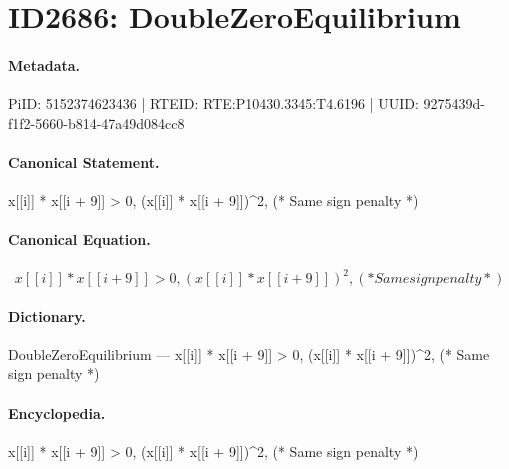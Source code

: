 \section*{ID2686: DoubleZeroEquilibrium}
\paragraph{Metadata.}
PiID: 5152374623436 | RTEID: RTE:P10430.3345:T4.6196 | UUID: 9275439d-f1f2-5660-b814-47a49d084cc8

\paragraph{Canonical Statement.}
x[[i]] * x[[i + 9]] > 0, (x[[i]] * x[[i + 9]])\textasciicircum{}2, (* Same sign penalty *)

\paragraph{Canonical Equation.}
\[
x[[i]] * x[[i + 9]] > 0, (x[[i]] * x[[i + 9]])^2, (* Same sign penalty *)
\]

\paragraph{Dictionary.}
DoubleZeroEquilibrium — x[[i]] * x[[i + 9]] > 0, (x[[i]] * x[[i + 9]])\textasciicircum{}2, (* Same sign penalty *)

\paragraph{Encyclopedia.}
x[[i]] * x[[i + 9]] > 0, (x[[i]] * x[[i + 9]])\textasciicircum{}2, (* Same sign penalty *)
